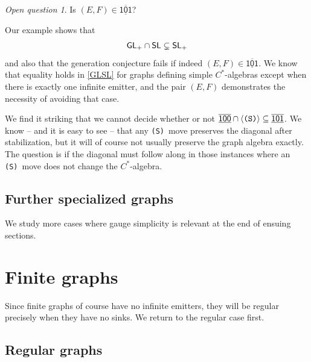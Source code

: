 \documentclass[12pt]{amsbook}%
\newenvironment{discu}{{\sc Discussion:}}{}
\theoremstyle{defin}
\theoremstyle{remark}
\newtheorem{openq}[theor]{Open question}
\numberwithin{equation}{chapter}
\numberwithin{theor}{section}
\newcommand{\xyzrel}[1]{\mbox{$\overline{\underline{\mathsf{ #1}}}$}}
\newcommand{\SSS}{\mbox{\texttt{\textup{(S)}}}}
\newcommand{\SL}{{\sf SL}}
\newcommand{\SLp}{\mbox{${\sf SL}_+$}}
\newcommand{\GLp}{\mbox{${\sf GL}_+$}}
\begin{document}
\begin{openq} 
Is $(E,F)\in \xyzrel{101}$?
\end{openq}
\begin{discu}
Our example shows that 
\begin{equation}\label{GLSL}
\GLp\cap \SL\subsetneq \SLp
\end{equation}
and also that the generation conjecture fails if indeed $(E,F)\in \xyzrel{101}$. We  know that equality holds in \eqref{GLSL} for graphs defining simple $C^*$-algebras except when there is exactly one infinite emitter, and the pair $(E,F)$ demonstrates the necessity of avoiding that case. 


We find it striking that we cannot decide whether or not $\xyzrel{100}\cap \langle \SSS\rangle\subseteq \xyzrel{101}$. We know -- and it is easy to see -- that any \SSS\ move preserves the diagonal after stabilization, but it will of course not usually preserve the graph algebra exactly. The question is if the diagonal must follow along in those instances where an \SSS\ move does not change the $C^*$-algebra.
\end{discu}



\section{Further specialized graphs}

We study more cases where gauge simplicity is  relevant at the end of ensuing sections.

\chapter{Finite  graphs}

Since finite graphs of course have no infinite emitters, they will be regular precisely when they have no sinks. We return to the regular case first.

\section{Regular graphs}\label{regcase}


\statusbar{\elsewhered}{\hered}{\sopen}{\here}{\elsewhered}{\sopen}{\sopen}{\here}
\end{document}

